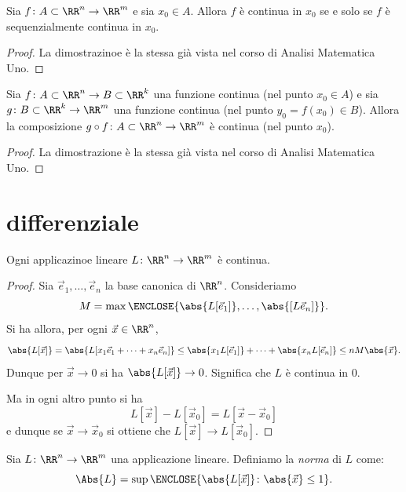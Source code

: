 \begin{theorem}
Sia $f\colon A\subset \RR^n\to \RR^m$ e sia $x_0\in A$.
Allora $f$ è continua in $x_0$ se e solo se $f$ è sequenzialmente 
continua in $x_0$.
\end{theorem}
\begin{proof}
La dimostrazinoe è la stessa già vista nel corso di Analisi Matematica Uno.
\end{proof}

\begin{theorem}
Sia $f\colon A\subset \RR^n \to B \subset \RR^k$ una funzione 
continua (nel punto $x_0\in A$) e sia $g\colon B\subset \RR^k \to \RR^m$ 
una funzione continua (nel punto $y_0=f(x_0)\in B$).
Allora la composizione $g\circ f \colon A \subset \RR^n \to \RR^m$ 
è continua (nel punto $x_0$).
\end{theorem}
%
\begin{proof}
La dimostrazione è la stessa già vista nel corso di Analisi Matematica Uno.
\end{proof}



\section{differenziale}


\begin{theorem}
  \label{th:lineare_continua}
Ogni applicazinoe lineare $L\colon \RR^n\to \RR^m$ 
è continua.
\end{theorem}
%
\begin{proof}
Sia $\vec e_1,\dots, \vec e_n$ la base canonica di $\RR^n$.
Consideriamo
\[
  M = \max\ENCLOSE{\abs{L[\vec e_1]}, \dots, \abs{[L\vec e_n]}}.
\]
Si ha allora, per ogni $\vec x\in \RR^n$,
\[
  \abs{L[\vec x]}
  =\abs{L[x_1 \vec e_1 + \dots + x_n \vec e_n]}
  \le \abs{x_1 L[\vec e_1]} + \dots + \abs{x_n L[\vec e_n]}
  \le nM\abs{\vec x}.
\]
Dunque per $\vec x \to 0$ si ha $\abs{L[\vec x]}\to 0$.
Significa che $L$ è continua in $0$.

Ma in ogni altro punto si ha 
\[
  L[\vec x] - L[\vec x_0] = L[\vec x - \vec x_0] 
\]
e dunque se $\vec x\to \vec x_0$ si ottiene che $L[\vec x]\to L[\vec x_0]$.
\end{proof}

\begin{definition}
Sia $L\colon \RR^n \to \RR^m$ una applicazione lineare.
Definiamo la \emph{norma} di $L$ come:
  \[
  \Abs{L} = \sup \ENCLOSE{\abs{L[\vec x]}\colon \abs{\vec x}\le 1}.
  \]
\end{definition}

